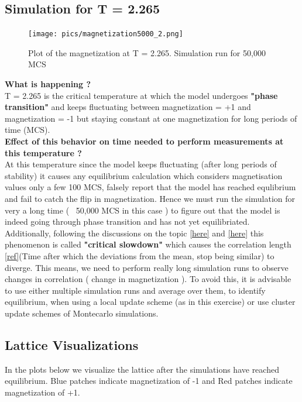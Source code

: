 \documentclass[a4paper,11pt]{article}
\begin{document}
\subsection{Simulation for T = 2.265}
\begin{figure}[!htb]
	\centering
    \texttt{[image: pics/magnetization5000\_2.png]}
    \caption{Plot of the magnetization at T = 2.265. Simulation run for 50,000 MCS}
	\label{fig:5kmag}
\end{figure}
\textbf{What is happening ?}\\
T = 2.265 is the critical temperature at which the model undergoes \textbf{"phase transition"} and keeps fluctuating between magnetization = +1 and magnetization = -1 but staying constant at one magnetization for long periods of time (MCS).\\
\textbf{Effect of this behavior on time needed to perform measurements at this temperature ?}\\
At this temperature since the model keeps fluctuating (after long periods of stability) it causes any equilibrium calculation which considers magnetisation values only a few 100 MCS, falsely report that the model has reached equlibrium and fail to catch the flip in magnetization. Hence we must run the simulation for very a long time ( ~50,000 MCS in this case ) to figure out that the model is indeed going through phase transition and has not yet equilibriated.\\
Additionally, following the discussions on the topic \href{http://physics.stackexchange.com/q/5771}{[here]} and \href{http://physics.stackexchange.com/q/183398}{[here]} this phenomenon is called \textbf{"critical slowdown"} which causes the correlation length \href{Reference https://www.physicsforums.com/threads/what-is-correlation-length.733954/}{[ref]}(Time after which the deviations from the mean, stop being similar) to diverge. This means, we need to perform really long simulation runs to observe changes in correlation ( change in magnetization ). To avoid this, it is advisable to use either multiple simulation runs and average over them, to identify equilibrium, when using a local update scheme (as in this exercise) or use cluster update schemes of Montecarlo simulations. 

\clearpage
\subsection{Lattice Visualizations}
In the plots below we visualize the lattice after the simulations have reached equilibrium. Blue patches indicate magnetization of -1 and Red patches indicate magnetization of +1.
\end{document}
